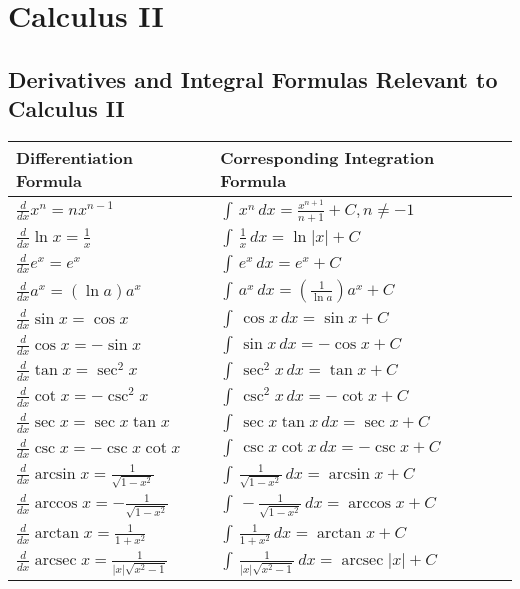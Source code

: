 \chapter{Calculus II}

\section{Derivatives and Integral Formulas Relevant to Calculus II}

\begin{table}[h]
  \centering
  \renewcommand{\arraystretch}{2}
  \begin{tabular}{p{5cm}p{7cm}}
  \toprule
  \textbf{Differentiation Formula} & \textbf{Corresponding Integration Formula}\\ \hline
  $\frac{d}{dx}x^n = nx^{n-1}$ & $\int \, x^n \, dx = \frac{x^{n+1}}{n+1} + C, n \neq -1$ \\ 
  \hline
  $\frac{d}{dx} \ln x = \frac{1}{x}$ & $\int \, \frac{1}{x} \, dx = \ln |x| + C$\\
  \hline
  $\frac{d}{dx} e^x = e^x$ & $\int \, e^x \, dx = e^x + C$\\
  \hline
  $\frac{d}{dx} a^x = (\ln a)a^x$ & $\int \, a^x \, dx = \left(\frac{1}{\ln a}\right)a^x + C$\\
  \hline
  $\frac{d}{dx} \sin x = \cos x$ & $\int \, \cos x \, dx = \sin x + C$\\
  \hline
  $\frac{d}{dx} \cos x = -\sin x$ & $\int \, \sin x \, dx = -\cos x + C$\\
  \hline
  $\frac{d}{dx} \tan x = \sec^2 x$ & $\int \, \sec^2x \, dx = \tan x + C$\\
  \hline
  $\frac{d}{dx} \cot x = -\csc^2 x$ & $\int \, \csc^2x \, dx = -\cot x + C$\\
  \hline
  $\frac{d}{dx} \sec x = \sec x \tan x$ & $\int \, \sec x \tan x \, dx = \sec x + C$\\
  \hline
  $\frac{d}{dx} \csc x = -\csc x \cot x$ & $\int \, \csc x \cot x \, dx = -\csc x + C$\\
  \hline
  $\frac{d}{dx} \arcsin x = \frac{1}{\sqrt{1-x^2}}$ & $\int \, \frac{1}{\sqrt{1-x^2}} \, dx = \arcsin x + C$\\
  \hline
  $\frac{d}{dx} \arccos x = -\frac{1}{\sqrt{1-x^2}}$ & $\int \, -\frac{1}{\sqrt{1-x^2}} \, dx = \arccos x + C$\\
  \hline
  $\frac{d}{dx} \arctan x = \frac{1}{1+x^2}$ & $\int \, \frac{1}{1+x^2} \, dx = \arctan x + C$\\
  \hline
  $\frac{d}{dx} \operatorname{arcsec} x = \frac{1}{|x|\sqrt{x^2-1}}$ & $\int \, \frac{1}{|x|\sqrt{x^2-1}} \, dx = \operatorname{arcsec} |x| + C$\\ \bottomrule
  \end{tabular}
  \end{table}


